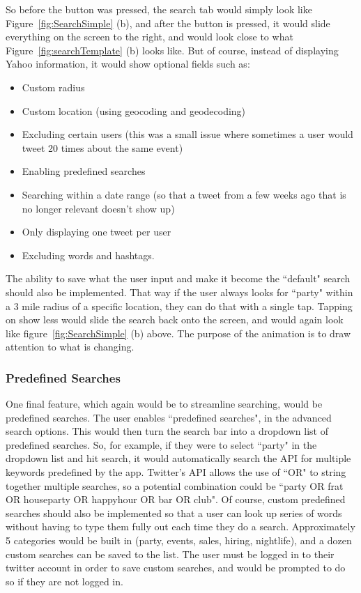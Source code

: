 \documentclass[11pt]{article}
\begin{document}
So before the button was pressed, the search tab would simply look like Figure~\ref{fig:SearchSimple} (b), and after the button is pressed, it would slide everything on the screen to the right, and would look close to what Figure~\ref{fig:searchTemplate} (b) looks like. But of course, instead of displaying Yahoo information, it would show optional fields such as: 

\begin{itemize}
\item Custom radius
\item Custom location (using geocoding and geodecoding)
\item Excluding certain users (this was a small issue where sometimes a user would tweet 20 times about the same event) 
\item Enabling predefined searches
\item Searching within a date range (so that a tweet from a few weeks ago that is no longer relevant doesn't show up)
\item Only displaying one tweet per user
\item Excluding words and hashtags. 
\end{itemize}

The ability to save what the user input and make it become the ``default" search should also be implemented. That way if the user always looks for ``party" within a 3 mile radius of a specific location, they can do that with a single tap. Tapping on show less would slide the search back onto the screen, and would again look like figure~\ref{fig:SearchSimple} (b) above. The purpose of the animation is to draw attention to what is changing. 

\subsubsection{Predefined Searches}

One final feature, which again would be to streamline searching, would be predefined searches. The user enables ``predefined searches", in the advanced search options. This would then turn the search bar into a dropdown list of predefined searches. So, for example, if they were to select ``party" in the dropdown list and hit search, it would automatically search the API for multiple keywords predefined by the app. Twitter's API allows the use of ``OR" to string together multiple searches, so a potential combination could be ``party OR frat OR houseparty OR happyhour OR bar OR club". Of course, custom predefined searches should also be implemented so that a user can look up series of words without having to type them fully out each time they do a search. Approximately 5 categories would be built in (party, events, sales, hiring, nightlife), and a dozen custom searches can be saved to the list. The user must be logged in to their twitter account in order to save custom searches, and would be prompted to do so if they are not logged in.
\end{document}
